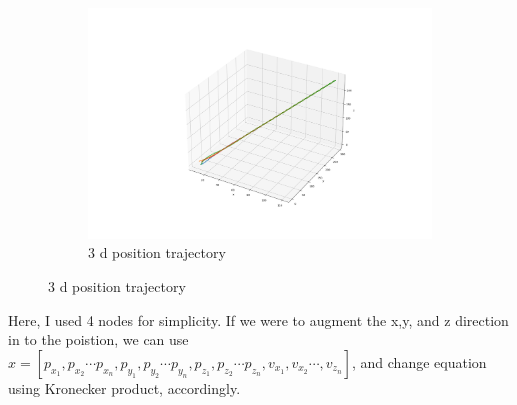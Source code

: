 \documentclass{article}
\begin{document}
\begin{problem}
\begin{figure}[!h]
\begin{subfigure}{0.35\textwidth}
            \includegraphics[width=\textwidth]{./img/p1_augmented.png}
            \caption{3 d position trajectory}
        \end{subfigure}
    
    \end{figure}
    Here, I used 4 nodes for simplicity.
    If we were to augment the x,y, and z direction in to the poistion, we can use \\$x =  [p_{x_1}, p_{x_2} \cdots p_{x_n},p_{y_1}, p_{y_2} \cdots p_{y_n}, p_{z_1}, p_{z_2} \cdots p_{z_n}, v_{x_1}, v_{x_2} \cdots, v_{z_n}]$, and change equation using Kronecker product, accordingly. 
\end{problem}
\end{document}

